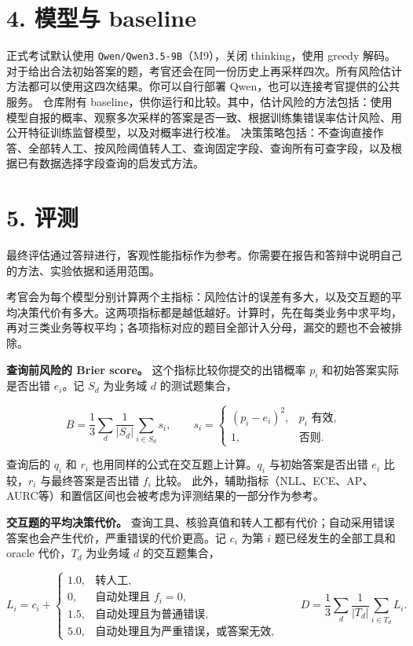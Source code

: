 \documentclass[11pt,a4paper]{article}
\begin{document}
\section{4. 模型与 baseline}\label{ux6a21ux578bux4e0e-baseline}

正式考试默认使用 \texttt{Qwen/Qwen3.5-9B}（M9），关闭 thinking，使用
greedy
解码。对于给出合法初始答案的题，考官还会在同一份历史上再采样四次。所有风险估计方法都可以使用这四次结果。你可以自行部署
Qwen，也可以连接考官提供的公共服务。
仓库附有
baseline，供你运行和比较。其中，估计风险的方法包括：使用模型自报的概率、观察多次采样的答案是否一致、根据训练集错误率估计风险、用公开特征训练监督模型，以及对概率进行校准。
决策策略包括：不查询直接作答、全部转人工、按风险阈值转人工、查询固定字段、查询所有可查字段，以及根据已有数据选择字段查询的启发式方法。

\section{5. 评测}\label{ux8bc4ux6d4b}

最终评估通过答辩进行，客观性能指标作为参考。你需要在报告和答辩中说明自己的方法、实验依据和适用范围。

考官会为每个模型分别计算两个主指标：风险估计的误差有多大，以及交互题的平均决策代价有多大。这两项指标都是越低越好。计算时，先在每类业务中求平均，再对三类业务等权平均；各项指标对应的题目全部计入分母，漏交的题也不会被排除。

\textbf{查询前风险的 Brier score。} 这个指标比较你提交的出错概率 \(p_i\)
和初始答案实际是否出错 \(e_i\)。记 \(S_d\) 为业务域 \(d\) 的测试题集合，

\[
B=\frac13\sum_{d}\frac{1}{|S_d|}\sum_{i\in S_d}s_i,\qquad
s_i=\begin{cases}(p_i-e_i)^2,&p_i\text{ 有效},\\ 1,&\text{否则}.\end{cases}
\]

查询后的 \(q_i\) 和 \(r_i\) 也用同样的公式在交互题上计算。\(q_i\)
与初始答案是否出错 \(e_i\) 比较，\(r_i\) 与最终答案是否出错 \(f_i\)
比较。
此外，辅助指标（NLL、ECE、AP、AURC等）和置信区间也会被考虑为评测结果的一部分作为参考。

\textbf{交互题的平均决策代价。}
查询工具、核验真值和转人工都有代价；自动采用错误答案也会产生代价，严重错误的代价更高。记
\(c_i\) 为第 \(i\) 题已经发生的全部工具和 oracle 代价，\(T_d\) 为业务域
\(d\) 的交互题集合，

\[
L_i=c_i+\begin{cases}
1.0,&\text{转人工},\\
0,&\text{自动处理且 } f_i=0,\\
1.5,&\text{自动处理且为普通错误},\\
5.0,&\text{自动处理且为严重错误，或答案无效},
\end{cases}
\qquad
D=\frac13\sum_{d}\frac{1}{|T_d|}\sum_{i\in T_d}L_i.
\]
\end{document}
